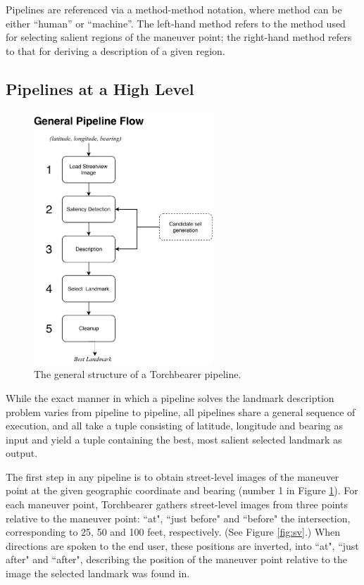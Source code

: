Pipelines are referenced via a method-method notation, where method can be either “human” or “machine”. The left-hand method refers to the method used for selecting salient regions of the maneuver point; the right-hand method refers to that for deriving a description of a given region.

\subsection{Pipelines at a High Level}
	
\begin{figure}[htbp]
  \centering
  \includegraphics[width=0.6\textwidth]{pipeline_diagrams/general.pdf}
  \caption{The general structure of a Torchbearer pipeline.}
  \label{fig:pipeline:overview}
\end{figure}

While the exact manner in which a pipeline solves the landmark description problem varies from pipeline to pipeline, all pipelines share a general sequence of execution, and all take a tuple consisting of latitude, longitude and bearing as input and yield a tuple containing the best, most salient selected landmark as output.

The first step in any pipeline is to obtain street-level images of the maneuver point at the given geographic coordinate and bearing (number 1 in Figure \ref{fig:pipeline:overview}). For each maneuver point, Torchbearer gathers street-level images from three points relative to the maneuver point: ``at", ``just before" and ``before" the intersection, corresponding to 25, 50 and 100 feet, respectively. (See Figure \ref{fig:sv}.) When directions are spoken to the end user, these positions are inverted, into ``at", ``just after" and ``after", describing the position of the maneuver point relative to the image the selected landmark was found in.

